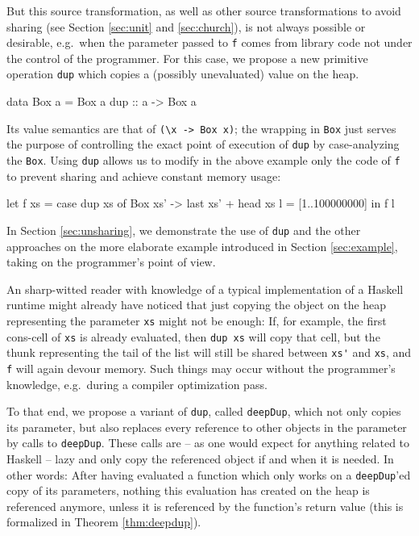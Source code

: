 \documentclass[preprint]{sigplanconf}
\theoremstyle{nonumberplain}
\newcommand{\li}{\lstinline[style=Haskell]}
\begin{document}
But this source transformation, as well as other source transformations to avoid sharing (see Section \ref{sec:unit} and \ref{sec:church}), is not always possible or desirable, e.g.\  when the parameter passed to \li-f- comes from library code not under the control of the programmer. For this case, we propose a new primitive operation \li-dup- which copies a (possibly unevaluated) value on the heap.
\begin{haskell}
data Box a = Box a
dup :: a -> Box a
\end{haskell}
Its value semantics are that of \li!(\x -> Box x)!; the wrapping in \li-Box- just serves the purpose of controlling the exact point of execution of \li-dup- by case-analyzing the \li-Box-. Using \li-dup- allows us to modify in the above example only the code of \li-f- to prevent sharing and achieve constant memory usage:
\begin{haskell}
let f xs = case dup xs of
    	Box xs' -> last xs' + head xs
    l = [1..100000000]
in  f l
\end{haskell}
In Section \ref{sec:unsharing}, we demonstrate the use of \li-dup- and the other approaches on the more elaborate example introduced in Section \ref{sec:example}, taking on the programmer’s point of view.

An sharp-witted reader with knowledge of a typical implementation of a Haskell runtime might already have noticed that just copying the object on the heap representing the parameter \li-xs- might not be enough: If, for example, the first cons-cell of \li-xs- is already evaluated, then \li-dup xs- will copy that cell, but the thunk representing the tail of the list will still be shared between \li-xs'- and \li-xs-, and \li-f- will again devour memory. Such things may occur without the programmer’s knowledge, e.g.\ during a compiler optimization pass.

To that end, we propose a variant of \li-dup-, called \li-deepDup-, which not only copies its parameter, but also replaces every reference to other objects in the parameter by calls to \li-deepDup-. These calls are -- as one would expect for anything related to Haskell -- lazy and only copy the referenced object if and when it is needed. In other words: After having evaluated a function which only works on a \li-deepDup-’ed copy of its parameters, nothing this evaluation has created on the heap is referenced anymore, unless it is referenced by the function's return value (this is formalized in Theorem \ref{thm:deepdup}).
\end{document}
